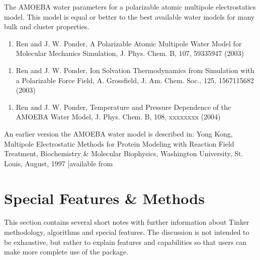 \documentclass[letterpaper,11pt,english]{sphinxmanual}
\begin{document}
The AMOEBA water parameters for a polarizable atomic multipole electrostatics model. This model is equal or better to the best available water models for many bulk and cluster properties.
\begin{enumerate}
%
\setcounter{enumi}{15}
\item {} 
Ren and J. W. Ponder, A Polarizable Atomic Multipole Water Model for Molecular Mechanics Simulation, J. Phys. Chem. B, 107, 5933\sphinxhyphen{}5947 (2003)

\end{enumerate}
\begin{enumerate}
%
\setcounter{enumi}{15}
\item {} 
Ren and J. W. Ponder, Ion Solvation Thermodynamics from Simulation with a Polarizable Force Field, A. Grossfield, J. Am. Chem. Soc., 125, 15671\sphinxhyphen{}15682 (2003)

\end{enumerate}
\begin{enumerate}
%
\setcounter{enumi}{15}
\item {} 
Ren and J. W. Ponder, Temperature and Pressure Dependence of the AMOEBA Water Model, J. Phys. Chem. B, 108, xxxx\sphinxhyphen{}xxxx (2004)

\end{enumerate}

An earlier version the AMOEBA water model is described in: Yong Kong, Multipole Electrostatic Methods for Protein Modeling with Reaction Field Treatment, Biochemistry \& Molecular Biophysics, Washington University, St. Louis, August, 1997 {[}available from \sphinxurl{http://dasher.wustl.edu/ponder/}{]}


\chapter{Special Features \& Methods}
\label{\detokenize{text/special-features:special-features-methods}}\label{\detokenize{text/special-features::doc}}
This section contains several short notes with further information about Tinker methodology, algorithms and special features. The discussion is not intended to be exhaustive, but rather to explain features and capabilities so that users can make more complete use of the package.
\end{document}
